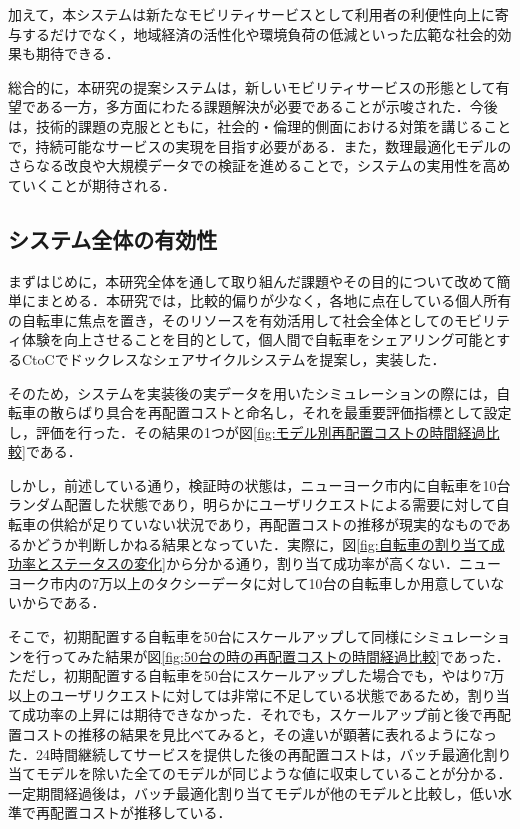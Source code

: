     \par 加えて，本システムは新たなモビリティサービスとして利用者の利便性向上に寄与するだけでなく，地域経済の活性化や環境負荷の低減といった広範な社会的効果も期待できる．
    \par 総合的に，本研究の提案システムは，新しいモビリティサービスの形態として有望である一方，多方面にわたる課題解決が必要であることが示唆された．今後は，技術的課題の克服とともに，社会的・倫理的側面における対策を講じることで，持続可能なサービスの実現を目指す必要がある．また，数理最適化モデルのさらなる改良や大規模データでの検証を進めることで，システムの実用性を高めていくことが期待される．
  
  \subsection{システム全体の有効性}
    \label{sec:システム全体の有効性}
      \par まずはじめに，本研究全体を通して取り組んだ課題やその目的について改めて簡単にまとめる．本研究では，比較的偏りが少なく，各地に点在している個人所有の自転車に焦点を置き，そのリソースを有効活用して社会全体としてのモビリティ体験を向上させることを目的として，個人間で自転車をシェアリング可能とするCtoCでドックレスなシェアサイクルシステムを提案し，実装した．
      \par そのため，システムを実装後の実データを用いたシミュレーションの際には，自転車の散らばり具合を再配置コストと命名し，それを最重要評価指標として設定し，評価を行った．その結果の1つが図\ref{fig:モデル別再配置コストの時間経過比較}である．
      \par しかし，前述している通り，検証時の状態は，ニューヨーク市内に自転車を10台ランダム配置した状態であり，明らかにユーザリクエストによる需要に対して自転車の供給が足りていない状況であり，再配置コストの推移が現実的なものであるかどうか判断しかねる結果となっていた．実際に，図\ref{fig:自転車の割り当て成功率とステータスの変化}から分かる通り，割り当て成功率が高くない．ニューヨーク市内の7万以上のタクシーデータに対して10台の自転車しか用意していないからである．
      \par そこで，初期配置する自転車を50台にスケールアップして同様にシミュレーションを行ってみた結果が図\ref{fig:50台の時の再配置コストの時間経過比較}であった．ただし，初期配置する自転車を50台にスケールアップした場合でも，やはり7万以上のユーザリクエストに対しては非常に不足している状態であるため，割り当て成功率の上昇には期待できなかった．それでも，スケールアップ前と後で再配置コストの推移の結果を見比べてみると，その違いが顕著に表れるようになった．24時間継続してサービスを提供した後の再配置コストは，バッチ最適化割り当てモデルを除いた全てのモデルが同じような値に収束していることが分かる．一定期間経過後は，バッチ最適化割り当てモデルが他のモデルと比較し，低い水準で再配置コストが推移している．
